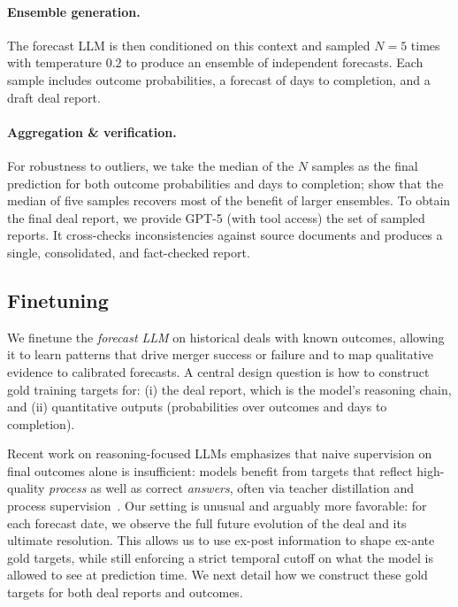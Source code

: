 \documentclass{article}
\theoremstyle{plain}
\theoremstyle{definition}
\theoremstyle{remark}
\begin{document}
\paragraph{Ensemble generation.}
The forecast LLM is then conditioned on this context and sampled $N=5$ times with temperature $0.2$ to produce an ensemble of independent forecasts. Each sample includes outcome probabilities, a forecast of days to completion, and a draft deal report. 

\paragraph{Aggregation \& verification.} For robustness to outliers, we take the median of the $N$ samples as the final prediction for both outcome probabilities and days to completion; \citet{alur2025aia} show that the median of five samples recovers most of the benefit of larger ensembles. To obtain the final deal report, we provide GPT-5 (with tool access) the set of sampled reports. It cross-checks inconsistencies against source documents and produces a single, consolidated, and fact-checked report.


\subsection{Finetuning}
\label{sec:finetuning}

We finetune the \emph{forecast LLM} on historical deals with known outcomes, allowing it to learn patterns that drive merger success or failure and to map qualitative evidence to calibrated forecasts. A central design question is how to construct gold training targets for: (i) the deal report, which is the model's reasoning chain, and (ii) quantitative outputs (probabilities over outcomes and days to completion).

Recent work on reasoning-focused LLMs emphasizes that naive supervision on final outcomes alone is insufficient: models benefit from targets that reflect high-quality \emph{process} as well as correct \emph{answers}, often via teacher distillation and process supervision~\cite{uesato2022process,lightman2023prm,luo2024automatedprm}. Our setting is unusual and arguably more favorable: for each forecast date, we observe the full future evolution of the deal and its ultimate resolution. This allows us to use ex-post information to shape ex-ante gold targets, while still enforcing a strict temporal cutoff on what the model is allowed to see at prediction time. We next detail how we construct these gold targets for both deal reports and outcomes.
\end{document}
